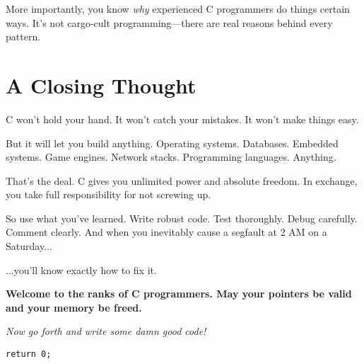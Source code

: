 \documentclass[10pt,openany]{book}
\begin{document}
More importantly, you know \textit{why} experienced C programmers do things certain ways. It's not cargo-cult programming---there are real reasons behind every pattern.

\section*{A Closing Thought}

C won't hold your hand. It won't catch your mistakes. It won't make things easy.

But it will let you build anything. Operating systems. Databases. Embedded systems. Game engines. Network stacks. Programming languages. Anything.

That's the deal. C gives you unlimited power and absolute freedom. In exchange, you take full responsibility for not screwing up.

So use what you've learned. Write robust code. Test thoroughly. Debug carefully. Comment clearly. And when you inevitably cause a segfault at 2 AM on a Saturday...

...you'll know exactly how to fix it.

\vspace{1em}

\textbf{Welcome to the ranks of C programmers. May your pointers be valid and your memory be freed.}

\vspace{1em}

\textit{Now go forth and write some damn good code!}

\vspace{2em}

\begin{center}
\texttt{return 0;}
\end{center}
\end{document}

